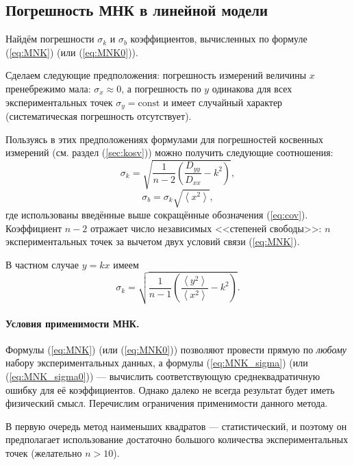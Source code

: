 \subsection{Погрешность МНК в линейной модели}

Найдём погрешности $\sigma_{k}$ и $\sigma_{b}$ коэффициентов, вычисленных
по формуле (\ref{eq:MNK}) (или (\ref{eq:MNK0})).

Сделаем следующие предположения: погрешность измерений величины $x$
пренебрежимо мала: $\sigma_{x}\approx0$, а погрешность по $y$ одинакова
для всех экспериментальных точек $\sigma_{y}=\mathrm{const}$ и имеет
случайный характер (систематическая погрешность отсутствует).

Пользуясь в этих предположениях формулами для погрешностей косвенных
измерений (см. раздел (\ref{sec:kosv})) можно получить следующие
соотношения:
\begin{equation}
    \label{eq:MNK_sigma}
    \sigma_{k}=\sqrt{\frac{1}{n-2}\left(\frac{D_{yy}}{D_{xx}}-k^{2}\right)},
\end{equation}
\begin{equation}
    \label{eq:MNK_sigma_b}
    \sigma_{b}=\sigma_{k}\sqrt{\left\langle x^{2}\right\rangle},
\end{equation}
где использованы введённые выше сокращённые обозначения (\ref{eq:cov}).
Коэффициент $n-2$ отражает число независимых <<степеней
свободы>>: $n$ экспериментальных точек за вычетом двух
условий связи (\ref{eq:MNK}).

В частном случае $y=kx$ имеем
\begin{equation}
\sigma_{k}=\sqrt{\frac{1}{n-1}\left(\frac{\left\langle y^{2}\right\rangle
}{\left\langle x^{2}\right\rangle }-k^{2}\right)}.\label{eq:MNK_sigma0}
\end{equation}


\paragraph{Условия применимости МНК.}

Формулы (\ref{eq:MNK}) (или (\ref{eq:MNK0})) позволяют провести
прямую по \emph{любому} набору экспериментальных данных, а формулы
(\ref{eq:MNK_sigma}) (или (\ref{eq:MNK_sigma0})) --- вычислить
соответствующую среднеквадратичную ошибку для её коэффициентов. Однако
далеко не всегда результат будет иметь физический смысл. Перечислим
ограничения применимости данного метода.

В первую очередь метод наименьших квадратов --- статистический,
и поэтому он предполагает использование достаточно большого количества
экспериментальных точек (желательно $n>10$).

